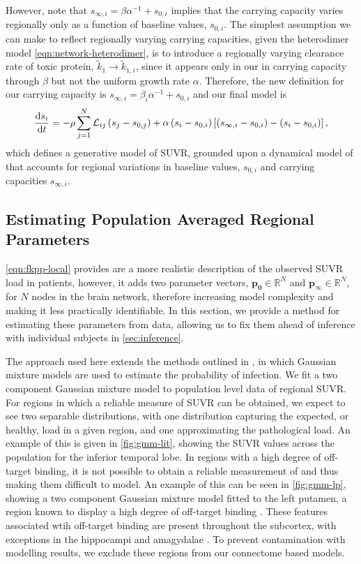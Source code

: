 However, note that $s_{\infty,i} = \beta\alpha^{-1} + s_{0,i}$ implies
that the carrying capacity varies regionally only as a function of baseline
values, $s_{0,i}.$ The simplest assumption we can make to reflect regionally
varying carrying capacities, given the heterodimer model
\cref{eqn:network-heterodimer}, is to introduce a regionally varying clearance
rate of toxic protein, $\tilde{k}_1 \rightarrow \tilde{k}_{1,i}$, since it
appears only in our in carrying capacity through $\beta$ but not the uniform
growth rate $\alpha$. Therefore, the new definition for our carrying capacity is
$s_{\infty,i} = \beta_i\alpha^{-1} + s_{0,i}$ and our final model is
\begin{equation}\label{eqn:fkpp-local}
    \dfrac{\mathrm{d}s_i}{\mathrm{d}t} = - \rho \sum\limits_{j=1}^{N}\mathcal{L}_{ij} \left(s_{j} - s_{0,j}\right)  
    + \alpha \left(s_{i} - s_{0,i}\right) \left[\left(s_{\infty, i} - s_{0,i}\right) - \left(s_{i} - s_{0,i}\right) \right],
\end{equation}
which defines a generative model of \TP SUVR, grounded upon a dynamical model of
\TP that accounts for regional variations in baseline values, $s_{0,i}$ and
carrying capacities $s_{\infty,i}$.


\subsection{Estimating Population Averaged Regional Parameters}
\label{sec:regionalparams}

\cref{eqn:fkpp-local} provides are a more realistic description of the 
observed \TP SUVR load in patients, however, it adds two parameter vectors, 
$\mathbf{p_0} \in \mathbb{R}^N$ and $\mathbf{p_\infty} \in \mathbb{R}^N$, for 
$N$ nodes in the brain network, therefore increasing model complexity and making 
it less practically identifiable. In this section, we provide a method
for estimating these parameters from data, allowing us to fix them ahead of
inference with individual subjects in \cref{sec:inference}. 

The approach used here extends the methods outlined in \cite{vogel2020spread}, 
in which Gaussian mixture models are used to estimate the 
probability of \TP infection. We fit a two 
component Gaussian mixture model to population level data of regional SUVR. 
For regions in which a reliable measure of \TP SUVR can be obtained, we expect 
to see two separable distributions, with one distribution capturing the 
expected, or healthy, \TP load in a given region, and one approximating the 
pathological \TP load. An example of this is given in \cref{fig:gmm-lit}, 
showing the SUVR values across the population for the inferior temporal lobe. 
In regions with a high degree of off-target binding, it is 
not possible to obtain a reliable measurement of \TP and thus making them 
difficult to model. An example of this 
can be seen in \cref{fig:gmm-lp}, showing a two component Gaussian 
mixture model fitted to the left putamen, a region known to display a high 
degree of off-target binding \cite{choi2018off}. These features associated wtih 
off-target binding are present throughout the subcortex, with exceptions in the 
hippocampi and amagydalae \cite{choi2018off, vogel2020spread}. To prevent
contamination with modelling results, we exclude these regions from our
connectome based models.

